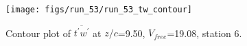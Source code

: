 \begin{figure}[H]
\centering
\texttt{[image: figs/run\_53/run\_53\_tw\_contour]}
\caption{Contour plot of $\overline{t^\prime w^\prime}$ at $z/c$=9.50, $V_{free}$=19.08, station 6.}
\end{figure}


